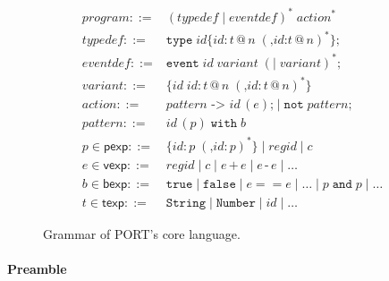 \begin{figure}[t]
\centering
\begin{align*}
\mathit{program} ::= {} &  (\mathit{typedef} \mid \mathit{eventdef})^* \; \mathit{action}^*\\
\mathit{typedef} ::= {} & \mathtt{type}\; \mathit{id} \texttt{\{}\mathit{id} \texttt{:}\, t\, \texttt{@}\, n \; (\texttt{,} \mathit{id}\texttt{:} t\,\texttt{@}\,n)^*\texttt{\};}\\
\mathit{eventdef} ::= {} & \mathtt{event}\; \mathit{id} \; \mathit{variant} \; (\texttt{|}\; \mathit{variant})^*\texttt{;}\\
\mathit{variant} ::= {} & \texttt{\{}\mathit{id}\; \mathit{id}\texttt{:}\, t\,\texttt{@}\,n \; (\texttt{,} \mathit{id}\texttt{:}\, t\,\texttt{@}\,n)^*\texttt{\}}\\
\mathit{action} ::= {} & \mathit{pattern} \texttt{ -> } \mathit{id}\,(e) \texttt{;} \mid \mathtt{not} \; \mathit{pattern} \texttt{;}\\
\mathit{pattern} ::= {} & \mathit{id}\,(p) \;\mathtt{with}\; b\\
p \in \mathsf{pexp} ::= {} & \texttt{\{} \mathit{id}\texttt{:}\, p \; (\texttt{,} \mathit{id}\texttt{:}\, p)^*\texttt{\}} \mid \mathit{regid} \mid c \\
e \in \mathsf{vexp} ::= {} & \mathit{regid} \mid c \mid e \,\texttt{+}\, e \mid e \,\texttt{-}\, e \mid \dots\\
b \in \mathsf{bexp} ::= {} & \mathtt{true} \mid \mathtt{false} \mid e == e \mid \ldots \mid p \;\mathtt{and}\; p \mid \dots\\
t \in \mathsf{texp} ::= {} & \mathtt{String} \mid \mathtt{Number} \mid \mathit{id} \mid \dots
\end{align*}
\caption{Grammar of PORT's core language.}
\label{lst:SyntaxGrammar}
\end{figure}

\paragraph*{Preamble}

